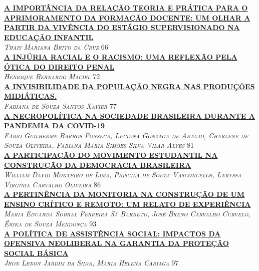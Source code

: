 \noindent \textsc{\hyperlink{trabalhos/249707.pdf.1}{\textbf{A IMPORTÂNCIA DA RELAÇÃO TEORIA E PRÁTICA PARA O APRIMORAMENTO DA FORMAÇÃO DOCENTE: UM OLHAR A PARTIR DA VIVÊNCIA DO ESTÁGIO SUPERVISIONADO NA EDUCAÇÃO INFANTIL}}}\\ 
\noindent \textsc{\textit{Thais Mariana Brito da Cruz}} \hfill 66\\ 

\noindent \textsc{\hyperlink{trabalhos/250282.pdf.1}{\textbf{A INJÚRIA RACIAL E O RACISMO: UMA REFLEXÃO PELA ÓTICA DO DIREITO PENAL}}}\\ 
\noindent \textsc{\textit{Henrique Bernardo Maciel}} \hfill 72\\ 

\noindent \textsc{\hyperlink{trabalhos/251848.pdf.1}{\textbf{A INVISIBILIDADE DA POPULAÇÃO NEGRA NAS PRODUÇÕES MIDIÁTICAS.}}}\\ 
\noindent \textsc{\textit{Fabiana de Souza Santos Xavier}} \hfill 77\\ 

\noindent \textsc{\hyperlink{trabalhos/250276.pdf.1}{\textbf{A NECROPOLÍTICA NA SOCIEDADE BRASILEIRA DURANTE A PANDEMIA DA COVID-19}}}\\ 
\noindent \textsc{\textit{Fábio Guilherme Barros Fonseca, Luciana Gonzaga de Araújo, Charlene de Souza Oliveira, Fabiana Maria Simões Silva Vilar Alves}} \hfill 81\\ 

\noindent \textsc{\hyperlink{trabalhos/251378.pdf.1}{\textbf{A PARTICIPAÇÃO DO MOVIMENTO ESTUDANTIL NA CONSTRUÇÃO DA DEMOCRACIA BRASILEIRA}}}\\ 
\noindent \textsc{\textit{William David Monteiro de Lima, Priscila de Souza Vasconcelos, Laryssa Virgínia Carvalho Oliveira}} \hfill 86\\ 

\noindent \textsc{\hyperlink{trabalhos/249819.pdf.1}{\textbf{A PERTINÊNCIA DA MONITORIA NA CONSTRUÇÃO DE UM ENSINO CRÍTICO E REMOTO: UM RELATO DE EXPERIÊNCIA}}}\\ 
\noindent \textsc{\textit{Maria Eduarda Sobral Ferreira Sá Barreto, José Breno Carvalho Curvelo, Érika de Souza Mendonça}} \hfill 93\\ 

\noindent \textsc{\hyperlink{trabalhos/249116.pdf.1}{\textbf{A POLÍTICA DE ASSISTÊNCIA SOCIAL: IMPACTOS DA OFENSIVA NEOLIBERAL NA GARANTIA DA PROTEÇÃO SOCIAL BÁSICA}}}\\ 
\noindent \textsc{\textit{Jhon Lenon Jardim da Silva, Maria Helena Cariaga}} \hfill 97\\ 

